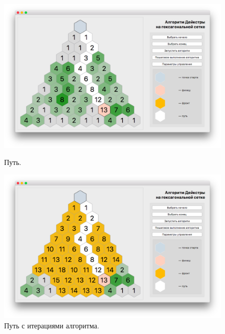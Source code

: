 \begin{figure}[h]
\begin{center}
\begin{minipage}[h]{0.47\linewidth}
\includegraphics[width=1\linewidth]{inc/img/path}
\caption{Путь.} %
\label{axis:cube} %
\end{minipage}
\hfill 
\begin{minipage}[h]{0.47\linewidth}
\includegraphics[width=1\linewidth]{inc/img/pathInAlg}
\caption{Путь с итерациями алгоритма.}
\label{axis:axial}
\end{minipage}
\end{center}
\end{figure}
